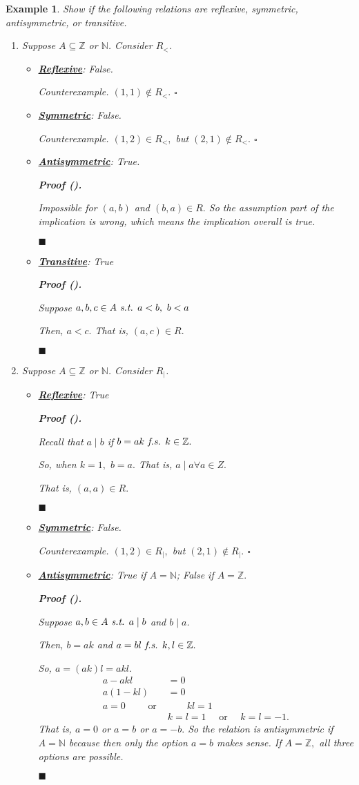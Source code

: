 \documentclass[12pt,a4paper]{article}
\newtheorem{eg}{Example}[subsection]
\newcounter{nprf}[subsection]
\newenvironment*{counter}{\par{\textit{Counterexample. }}}{\hfill{$\square$}\par}
\newenvironment*{prf}{\par\indent\textbf{\textit{Proof} (\stepcounter{nprf}\thenprf). }\par }{\par\hfill $\blacksquare$\par}
\def\Z{{\mathbb{Z}}}
\def\N{{\mathbb{N}}}
\def\st{\emph{ s.t. }}
\def\fs{\emph{ f.s. }}
\begin{document}
\begin{eg}
Show if the following relations are reflexive, symmetric, antisymmetric, or transitive.
\begin{enumerate}
	\item Suppose $A\subseteq\Z$ or $\N$. Consider $R_<$. 
	\begin{itemize}
		\item \textbf{\underline{Reflexive}}: False.
		\begin{counter}
			$(1,1)\notin R_<.$	
		\end{counter}
		\item \textbf{\underline{Symmetric}}: False.
		\begin{counter}
			$(1,2)\in R_<,$ but $(2,1)\notin R_<.$
		\end{counter}
		\item \textbf{\underline{Antisymmetric}}: True.
		\begin{prf} Impossible for $(a,b)$ and $(b,a)\in R.$ So the assumption part of the implication is wrong, which means the implication overall is true. \end{prf}
		\item \textbf{\underline{Transitive}}: True
		\begin{prf}
			Suppose $a,b,c\in A\st a<b,\ b<a$\par Then, $a<c.$ That is, $(a,c)\in R.$
		\end{prf}
	\end{itemize}
	\item Suppose $A\subseteq\Z$ or $\N$. Consider $R_|$.
	\begin{itemize}
		\item \textbf{\underline{Reflexive}}: True
		\begin{prf}
			Recall that $a\mid b$ if $b=ak\fs k\in\Z.$\par So, when $k=1,$ $b=a.$ That is, $a\mid a\forall a\in Z.$\par That is, $(a,a)\in R.$
		\end{prf}
		\item \textbf{\underline{Symmetric}}: False.
		\begin{counter}
			$(1,2)\in R_|,$ but $(2,1)\notin R_|.$	
		\end{counter}
		\item \textbf{\underline{Antisymmetric}}: True if $A=\N$; False if $A=\Z.$
		\begin{prf}
			Suppose $a,b\in A\st a\mid b$ and $b\mid a$.\par Then, $b=ak$ and $a=bl\fs k,l\in\Z.$\par So, $a=(ak)l=akl.$ \[\begin{aligned}a-akl&=0\\a(1-kl)&=0\\a=0\qquad\text{ or }&\qquad kl=1\\&k=l=1\quad\text{ or }\quad k=l=-1.\end{aligned}\] That is, $a=0$ or $a=b$ or $a=-b.$ So the relation is antisymmetric if $A=\N$ because then only the option $a=b$ makes sense. If $A=\Z,$ all three options are possible. 

\end{prf}
\end{itemize}
\end{enumerate}
\end{eg}
\end{document}
